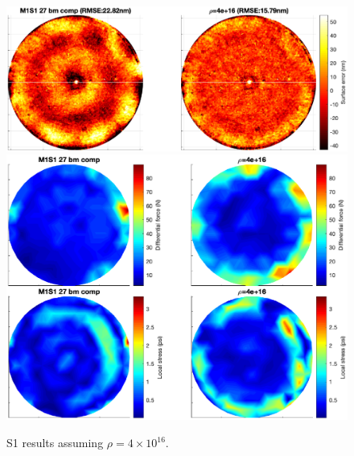 \documentclass{gmto}
\begin{document}
\begin{figure}[!p]
\centering
\includegraphics[width=\textwidth]{./pictures/s1_surfaceRMSE_rho4e16.eps}
\vfill
\includegraphics[width=\textwidth]{./pictures/s1_NG_sigma_rho4e16.eps}
\caption{\textsf{S1} results assuming $\rho=4\times10^{16}$.}
\label{fig:s1_altrho_results}
\end{figure}
\end{document}
